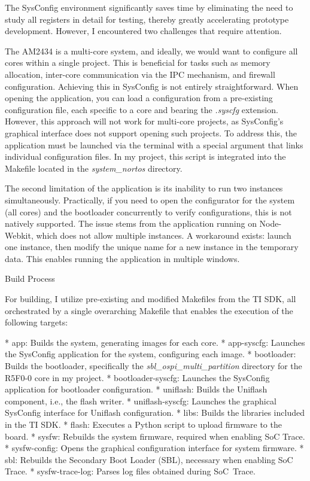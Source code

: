 The SysConfig environment significantly saves time by eliminating the need to study all registers in detail for testing, thereby greatly accelerating prototype development. However, I encountered two challenges that require attention.

The AM2434 is a multi-core system, and ideally, we would want to configure all cores within a single project. This is beneficial for tasks such as memory allocation, inter-core communication via the IPC mechanism, and firewall configuration. Achieving this in SysConfig is not entirely straightforward. When opening the application, you can load a configuration from a pre-existing configuration file, each specific to a core and bearing the {\it .syscfg} extension. However, this approach will not work for multi-core projects, as SysConfig’s graphical interface does not support opening such projects. To address this, the application must be launched via the terminal with a special argument that links individual configuration files. In my project, this script is integrated into the Makefile located in the {\it system_nortos} directory.

The second limitation of the application is its inability to run two instances simultaneously. Practically, if you need to open the configurator for the system (all cores) and the bootloader concurrently to verify configurations, this is not natively supported. The issue stems from the application running on Node-Webkit, which does not allow multiple instances. A workaround exists: launch one instance, then modify the unique name for a new instance in the temporary data. This enables running the application in multiple windows.

\secc Build Process

For building, I utilize pre-existing and modified Makefiles from the TI SDK, all orchestrated by a single overarching Makefile that enables the execution of the following targets:

\begitems
* {\sbf app}: Builds the system, generating images for each core.
* {\sbf app-syscfg}: Launches the SysConfig application for the system, configuring each image.
* {\sbf bootloader}: Builds the bootloader, specifically the {\it sbl_ospi_multi_partition} directory for the R5F0-0 core in my project.
* {\sbf bootloader-syscfg}: Launches the SysConfig application for bootloader configuration.
* {\sbf uniflash}: Builds the Uniflash component, i.e., the flash writer.
* {\sbf uniflash-syscfg}: Launches the graphical SysConfig interface for Uniflash configuration.
* {\sbf libs}: Builds the libraries included in the TI SDK.
* {\sbf flash}: Executes a Python script to upload firmware to the board.
* {\sbf sysfw}: Rebuilds the system firmware, required when enabling SoC Trace.
* {\sbf sysfw-config}: Opens the graphical configuration interface for system firmware.
* {\sbf sbl}: Rebuilds the Secondary Boot Loader (SBL), necessary when enabling SoC Trace.
* {\sbf sysfw-trace-log}: Parses log files obtained during SoC~Trace.
\enditems

